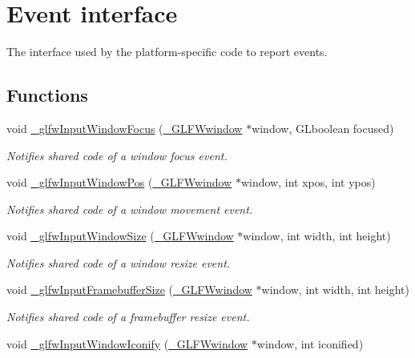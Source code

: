 \hypertarget{group__event}{}\section{Event interface}
\label{group__event}


The interface used by the platform-\/specific code to report events.  


\subsection*{Functions}
\begin{DoxyCompactItemize}
\item 
void \hyperlink{group__event_gaa544de6806bb1cb6236c84e58b7382b9}{\+\_\+glfw\+Input\+Window\+Focus} (\hyperlink{struct__GLFWwindow}{\+\_\+\+G\+L\+F\+Wwindow} $\ast$window, G\+Lboolean focused)
\begin{DoxyCompactList}\small\item\em Notifies shared code of a window focus event. \end{DoxyCompactList}\item 
void \hyperlink{group__event_ga962296ec91d0c2e9576f6b72222cb382}{\+\_\+glfw\+Input\+Window\+Pos} (\hyperlink{struct__GLFWwindow}{\+\_\+\+G\+L\+F\+Wwindow} $\ast$window, int xpos, int ypos)
\begin{DoxyCompactList}\small\item\em Notifies shared code of a window movement event. \end{DoxyCompactList}\item 
void \hyperlink{group__event_ga4becb396bda8c2a525a3d08d86354c6b}{\+\_\+glfw\+Input\+Window\+Size} (\hyperlink{struct__GLFWwindow}{\+\_\+\+G\+L\+F\+Wwindow} $\ast$window, int width, int height)
\begin{DoxyCompactList}\small\item\em Notifies shared code of a window resize event. \end{DoxyCompactList}\item 
void \hyperlink{group__event_ga1f8385157e99fea8cc960c0fb2f2fc47}{\+\_\+glfw\+Input\+Framebuffer\+Size} (\hyperlink{struct__GLFWwindow}{\+\_\+\+G\+L\+F\+Wwindow} $\ast$window, int width, int height)
\begin{DoxyCompactList}\small\item\em Notifies shared code of a framebuffer resize event. \end{DoxyCompactList}\item 
void \hyperlink{group__event_gaacf163ce8bb6e5fb20b7243c53b9a2fa}{\+\_\+glfw\+Input\+Window\+Iconify} (\hyperlink{struct__GLFWwindow}{\+\_\+\+G\+L\+F\+Wwindow} $\ast$window, int iconified)

\end{DoxyCompactItemize}
